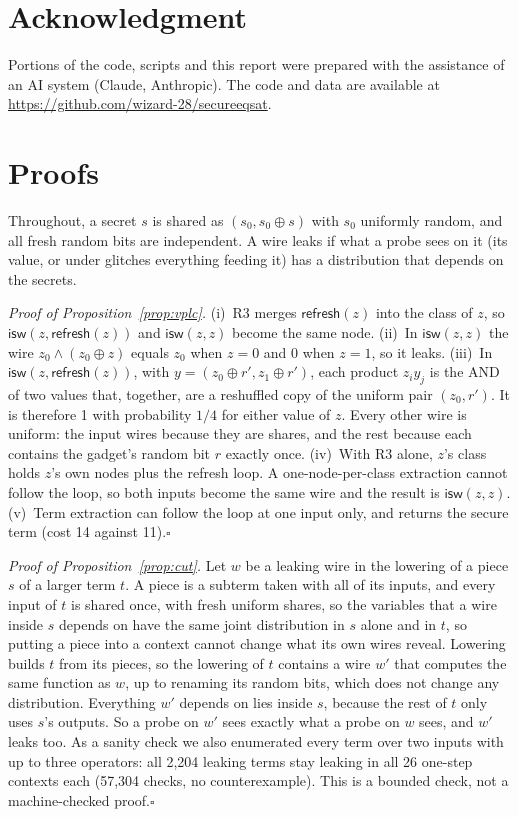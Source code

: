 \documentclass[conference]{IEEEtran}
\newcommand{\rf}{\mathsf{refresh}}
\newcommand{\isw}{\mathsf{isw}}
\begin{document}
\section*{Acknowledgment}
Portions of the code, scripts and this report were prepared with the assistance of an AI system (Claude, Anthropic). The code and data are available at \url{https://github.com/wizard-28/secureeqsat}.

\appendices
\section{Proofs}\label{app:proofs}
Throughout, a secret $s$ is shared as $(s_0,s_0\oplus s)$ with $s_0$ uniformly random, and all fresh random bits are independent. A wire leaks if what a probe sees on it (its value, or under glitches everything feeding it) has a distribution that depends on the secrets.

\emph{Proof of Proposition~\ref{prop:vplc}.}
(i)~R3 merges $\rf(z)$ into the class of $z$, so $\isw(z,\rf(z))$ and $\isw(z,z)$ become the same node.
(ii)~In $\isw(z,z)$ the wire $z_0\wedge(z_0\oplus z)$ equals $z_0$ when $z=0$ and $0$ when $z=1$, so it leaks.
(iii)~In $\isw(z,\rf(z))$, with $y=(z_0\oplus r',z_1\oplus r')$, each product $z_iy_j$ is the AND of two values that, together, are a reshuffled copy of the uniform pair $(z_0,r')$. It is therefore 1 with probability $1/4$ for either value of $z$. Every other wire is uniform: the input wires because they are shares, and the rest because each contains the gadget's random bit $r$ exactly once.
(iv)~With R3 alone, $z$'s class holds $z$'s own nodes plus the refresh loop. A one-node-per-class extraction cannot follow the loop, so both inputs become the same wire and the result is $\isw(z,z)$.
(v)~Term extraction can follow the loop at one input only, and returns the secure term (cost 14 against 11).\hfill$\square$

\emph{Proof of Proposition~\ref{prop:cut}.}
Let $w$ be a leaking wire in the lowering of a piece $s$ of a larger term $t$. A piece is a subterm taken with all of its inputs, and every input of $t$ is shared once, with fresh uniform shares, so the variables that a wire inside $s$ depends on have the same joint distribution in $s$ alone and in $t$, so putting a piece into a context cannot change what its own wires reveal. Lowering builds $t$ from its pieces, so the lowering of $t$ contains a wire $w'$ that computes the same function as $w$, up to renaming its random bits, which does not change any distribution. Everything $w'$ depends on lies inside $s$, because the rest of $t$ only uses $s$'s outputs. So a probe on $w'$ sees exactly what a probe on $w$ sees, and $w'$ leaks too. As a sanity check we also enumerated every term over two inputs with up to three operators: all 2,204 leaking terms stay leaking in all 26 one-step contexts each (57,304 checks, no counterexample). This is a bounded check, not a machine-checked proof.\hfill$\square$
\end{document}
